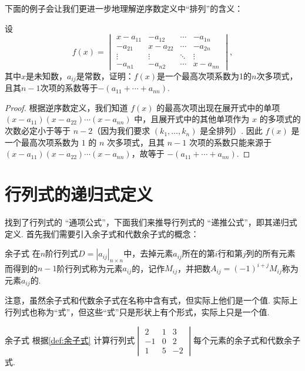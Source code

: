下面的例子会让我们更进一步地理解逆序数定义中``排列''的含义：
\begin{example}{}{}
    设
    \[f(x)=\begin{vmatrix}
            x-a_{11} & -a_{12}  & \cdots & -a_{1n}  \\
            -a_{21}  & x-a_{22} & \cdots & -a_{2n}  \\
            \vdots   & \vdots   & \ddots & \vdots   \\
            -a_{n1}  & -a_{n2}  & \cdots & x-a_{nn}
        \end{vmatrix},\]
    其中$x$是未知数，$a_{ij}$是常数，证明：$f(x)$是一个最高次项系数为1的$n$次多项式，且其$n-1$次项的系数等于$-(a_{11}+\cdots+a_{nn})$.
\end{example}

\begin{proof}
    根据逆序数定义，我们知道 $f(x)$ 的最高次项出现在展开式中的单项 $(x-a_{11})(x-a_{22})\cdots(x-a_{nn})$ 中，且展开式中的其他单项作为 $x$ 的多项式的次数必定小于等于 $n-2$（因为我们要求 $(k_1,\ldots,k_n)$ 是全排列）. 因此 $f(x)$ 是一个最高次项系数为 $1$ 的 $n$ 次多项式，且其 $n-1$ 次项的系数只能来源于 $(x-a_{11})(x-a_{22})\cdots(x-a_{nn})$，故等于 $-(a_{11}+\cdots+a_{nn})$.
\end{proof}

\section{行列式的递归式定义}

找到了行列式的 ``通项公式''，下面我们来推导行列式的 ``递推公式''，即其递归式定义. 首先我们需要引入余子式和代数余子式的概念：

\begin{definition}{}{余子式}
    在$n$阶行列式$D=|a_{ij}|_{n \times n}$中，去掉元素$a_{ij}$所在的第$i$行和第$j$列的所有元素而得到的$n-1$阶行列式称为元素$a_{ij}$的，记作$M_{ij}$，并把数$A_{ij}=(-1)^{i+j}M_{ij}$称为元素$a_{ij}$的.
\end{definition}

注意，虽然余子式和代数余子式在名称中含有式，但实际上他们是一个值. 实际上行列式也称为``式''，但这些``式''只是形状上有个形式，实际上只是一个值.
\begin{example}{}{余子式}
    根据\autoref{def:余子式} 计算行列式$\begin{vmatrix}
            2  & 1 & 3  \\
            -1 & 0 & 2  \\
            1  & 5 & -2
        \end{vmatrix}$每个元素的余子式和代数余子式.
\end{example}

